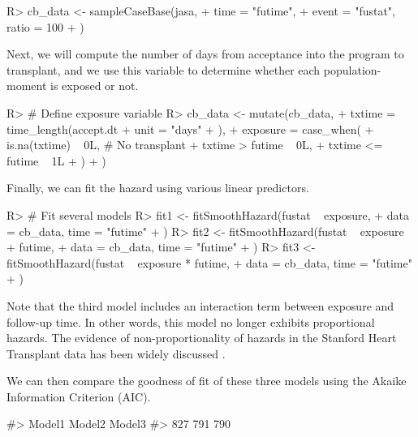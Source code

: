 \documentclass[
]{jss}
\begin{document}
\begin{CodeChunk}

\begin{CodeInput}
R> cb_data <- sampleCaseBase(jasa,
+   time = "futime",
+   event = "fustat", ratio = 100
+ )
\end{CodeInput}
\end{CodeChunk}

Next, we will compute the number of days from acceptance into the
program to transplant, and we use this variable to determine whether
each population-moment is exposed or not.

\begin{CodeChunk}

\begin{CodeInput}
R> # Define exposure variable
R> cb_data <- mutate(cb_data,
+   txtime = time_length(accept.dt %
+                        unit = "days"
+   ),
+   exposure = case_when(
+     is.na(txtime) ~ 0L, # No transplant
+     txtime > futime ~ 0L,
+     txtime <= futime ~ 1L
+   )
+ )
\end{CodeInput}
\end{CodeChunk}

Finally, we can fit the hazard using various linear predictors.

\begin{CodeChunk}

\begin{CodeInput}
R> # Fit several models
R> fit1 <- fitSmoothHazard(fustat ~ exposure,
+   data = cb_data, time = "futime"
+ )
R> fit2 <- fitSmoothHazard(fustat ~ exposure + futime,
+   data = cb_data, time = "futime"
+ )
R> fit3 <- fitSmoothHazard(fustat ~ exposure * futime,
+   data = cb_data, time = "futime"
+ )
\end{CodeInput}
\end{CodeChunk}

Note that the third model includes an interaction term between exposure
and follow-up time. In other words, this model no longer exhibits
proportional hazards. The evidence of non-proportionality of hazards in
the Stanford Heart Transplant data has been widely discussed
\citep{arjas1988graphical}.

We can then compare the goodness of fit of these three models using the
Akaike Information Criterion (AIC).

\begin{CodeChunk}

\begin{CodeOutput}
#> Model1 Model2 Model3 
#>    827    791    790
\end{CodeOutput}
\end{CodeChunk}
\end{document}
